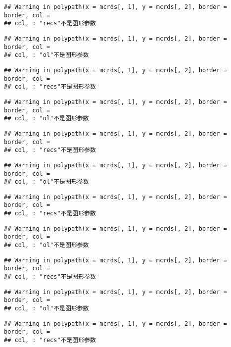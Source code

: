 \documentclass[]{article}
\begin{document}
\begin{verbatim}
## Warning in polypath(x = mcrds[, 1], y = mcrds[, 2], border = border, col =
## col, : "recs"不是图形参数
\end{verbatim}

\begin{verbatim}
## Warning in polypath(x = mcrds[, 1], y = mcrds[, 2], border = border, col =
## col, : "ol"不是图形参数
\end{verbatim}

\begin{verbatim}
## Warning in polypath(x = mcrds[, 1], y = mcrds[, 2], border = border, col =
## col, : "recs"不是图形参数
\end{verbatim}

\begin{verbatim}
## Warning in polypath(x = mcrds[, 1], y = mcrds[, 2], border = border, col =
## col, : "ol"不是图形参数
\end{verbatim}

\begin{verbatim}
## Warning in polypath(x = mcrds[, 1], y = mcrds[, 2], border = border, col =
## col, : "recs"不是图形参数
\end{verbatim}

\begin{verbatim}
## Warning in polypath(x = mcrds[, 1], y = mcrds[, 2], border = border, col =
## col, : "ol"不是图形参数
\end{verbatim}

\begin{verbatim}
## Warning in polypath(x = mcrds[, 1], y = mcrds[, 2], border = border, col =
## col, : "recs"不是图形参数
\end{verbatim}

\begin{verbatim}
## Warning in polypath(x = mcrds[, 1], y = mcrds[, 2], border = border, col =
## col, : "ol"不是图形参数
\end{verbatim}

\begin{verbatim}
## Warning in polypath(x = mcrds[, 1], y = mcrds[, 2], border = border, col =
## col, : "recs"不是图形参数
\end{verbatim}

\begin{verbatim}
## Warning in polypath(x = mcrds[, 1], y = mcrds[, 2], border = border, col =
## col, : "ol"不是图形参数
\end{verbatim}

\begin{verbatim}
## Warning in polypath(x = mcrds[, 1], y = mcrds[, 2], border = border, col =
## col, : "recs"不是图形参数
\end{verbatim}
\end{document}
